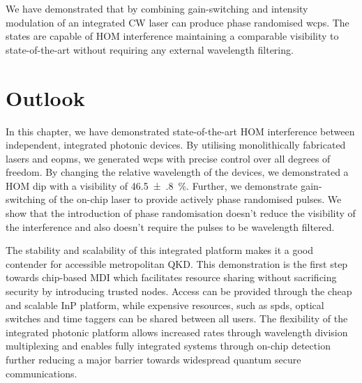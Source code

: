 We have demonstrated that by combining gain-switching and intensity modulation of an integrated \ac{CW} laser can produce phase randomised \acp{wcp}. The states are capable of \ac{HOM} interference maintaining a comparable visibility to state-of-the-art without requiring any external wavelength filtering.

\section{Outlook}

In this chapter, we have demonstrated state-of-the-art \acl{HOM} interference between independent, integrated photonic devices. By utilising monolithically fabricated lasers and \acp{eopm}, we generated \acp{wcp} with precise control over all degrees of freedom. By changing the relative wavelength of the devices, we demonstrated a \ac{HOM} dip with a visibility of \SI{46.5(8)}{\%}. Further, we demonstrate gain-switching of the on-chip laser to provide actively phase randomised pulses. We show that the introduction of phase randomisation doesn't reduce the visibility of the interference and also doesn't require the pulses to be wavelength filtered.



The stability and scalability of this integrated platform makes it a good contender for accessible metropolitan \ac{QKD}. This demonstration is the first step towards chip-based \ac{MDI} which facilitates resource sharing without sacrificing security by introducing trusted nodes. Access can be provided through the cheap and scalable \ac{InP} platform, while expensive resources, such as \acp{spd}, optical switches and time taggers can be shared between all users. The flexibility of the integrated photonic platform allows increased rates through wavelength division multiplexing \cite{price2018} and enables fully integrated systems through on-chip detection \cite{akhlaghi2015} further reducing a major barrier towards widespread quantum secure communications.

